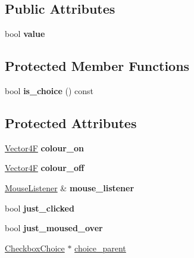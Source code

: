 \subsection*{Public Attributes}
\begin{DoxyCompactItemize}
\item 
\mbox{\label{class_checkbox_ac423af3bf4b58bc68ce79392ce11b291}} 
bool {\bfseries value}
\end{DoxyCompactItemize}
\subsection*{Protected Member Functions}
\begin{DoxyCompactItemize}
\item 
\mbox{\label{class_checkbox_a7d468fd5e0d9be7eeb498f511fa23f16}} 
bool {\bfseries is\+\_\+choice} () const
\end{DoxyCompactItemize}
\subsection*{Protected Attributes}
\begin{DoxyCompactItemize}
\item 
\mbox{\label{class_checkbox_adf8806f2b48dfe1d415d108f3ef5bc8c}} 
\mbox{\hyperlink{class_vector4}{Vector4F}} {\bfseries colour\+\_\+on}
\item 
\mbox{\label{class_checkbox_a09f7af816849a1b505af2e746847fcc4}} 
\mbox{\hyperlink{class_vector4}{Vector4F}} {\bfseries colour\+\_\+off}
\item 
\mbox{\label{class_checkbox_a7cf00bf1e5b41dcf590e7e836e937ead}} 
\mbox{\hyperlink{class_mouse_listener}{Mouse\+Listener}} \& {\bfseries mouse\+\_\+listener}
\item 
\mbox{\label{class_checkbox_af3cb6394e0b1d37a504ff4eaca946aa8}} 
bool {\bfseries just\+\_\+clicked}
\item 
\mbox{\label{class_checkbox_afbbde2ae6d330fb75a26210642407b1f}} 
bool {\bfseries just\+\_\+moused\+\_\+over}
\item 
\mbox{\hyperlink{class_checkbox_choice}{Checkbox\+Choice}} $\ast$ \mbox{\hyperlink{class_checkbox_adf30cd14778fdae212e6c97ec456a700}{choice\+\_\+parent}}
\end{DoxyCompactItemize}
